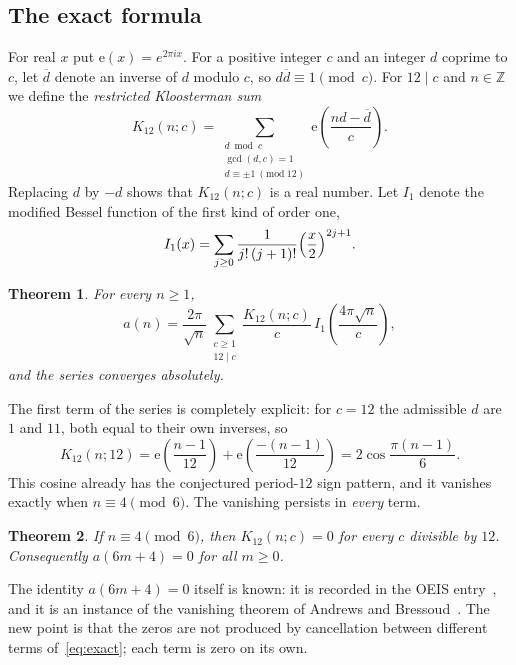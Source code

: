 \documentclass[11pt]{amsart}
\numberwithin{equation}{section}
\newtheorem{theorem}{Theorem}[section]
\theoremstyle{definition}
\theoremstyle{remark}
\newcommand{\e}{\mathrm{e}}
\newcommand{\Z}{\mathbb{Z}}
\newcommand{\inv}[1]{\overline{#1}}
\begin{document}
\subsection{The exact formula}
For real $x$ put $\e(x)=e^{2\pi i x}$. For a positive integer $c$ and an integer $d$ coprime to $c$, let $\inv d$ denote an inverse of $d$ modulo $c$, so $d\inv d\equiv1\pmod c$. For $12\mid c$ and $n\in\Z$ we define the \emph{restricted Kloosterman sum}
\begin{equation}\label{eq:K12}
K_{12}(n;c)=\sum_{\substack{d \bmod c\\ \gcd(d,c)=1\\ d\equiv\pm1 \ (\mathrm{mod}\ 12)}}\e\!\left(\frac{nd-\inv d}{c}\right).
\end{equation}
Replacing $d$ by $-d$ shows that $K_{12}(n;c)$ is a real number. Let $I_1$ denote the modified Bessel function of the first kind of order one,
\begin{equation}\label{eq:I1}
I_1(x)=\sum_{j\ge0}\frac{1}{j!\,(j+1)!}\Bigl(\frac x2\Bigr)^{2j+1}.
\end{equation}

\begin{theorem}\label{thm:exact}
For every $n\ge1$,
\begin{equation}\label{eq:exact}
a(n)=\frac{2\pi}{\sqrt n}\sum_{\substack{c\ge1\\12\mid c}}\frac{K_{12}(n;c)}{c}\,I_1\!\left(\frac{4\pi\sqrt n}{c}\right),
\end{equation}
and the series converges absolutely.
\end{theorem}

The first term of the series is completely explicit: for $c=12$ the admissible $d$ are $1$ and $11$, both equal to their own inverses, so
\begin{equation}\label{eq:K12first}
K_{12}(n;12)=\e\!\left(\frac{n-1}{12}\right)+\e\!\left(\frac{-(n-1)}{12}\right)=2\cos\frac{\pi(n-1)}{6}.
\end{equation}
This cosine already has the conjectured period-$12$ sign pattern, and it vanishes exactly when $n\equiv4\pmod 6$. The vanishing persists in \emph{every} term.

\begin{theorem}\label{thm:vanish}
If $n\equiv4\pmod6$, then $K_{12}(n;c)=0$ for every $c$ divisible by $12$. Consequently $a(6m+4)=0$ for all $m\ge0$.
\end{theorem}

The identity $a(6m+4)=0$ itself is known: it is recorded in the OEIS entry~\cite{OEIS}, and it is an instance of the vanishing theorem of Andrews and Bressoud~\cite{AB}. The new point is that the zeros are not produced by cancellation between different terms of~\eqref{eq:exact}; each term is zero on its own.
\end{document}
